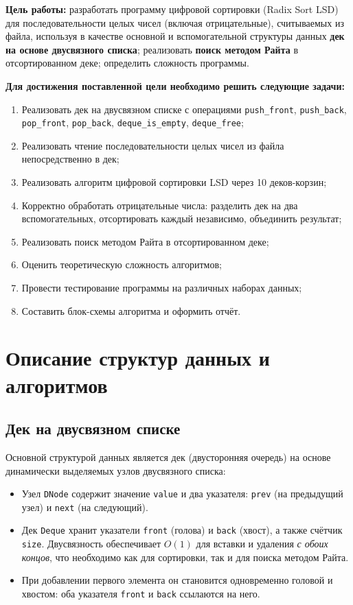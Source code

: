 \documentclass[a4paper,14pt]{extarticle}
\begin{document}
\textbf{Цель работы:} разработать программу цифровой сортировки (Radix Sort LSD) для последовательности целых чисел (включая отрицательные), считываемых из файла, используя в качестве основной и вспомогательной структуры данных \textbf{дек на основе двусвязного списка}; реализовать \textbf{поиск методом Райта} в отсортированном деке; определить сложность программы.

\vspace{0.5cm}
\textbf{Для достижения поставленной цели необходимо решить следующие задачи:}
\begin{enumerate}
  \item Реализовать дек на двусвязном списке с операциями \texttt{push\_front}, \texttt{push\_back}, \texttt{pop\_front}, \texttt{pop\_back}, \texttt{deque\_is\_empty}, \texttt{deque\_free};
  \item Реализовать чтение последовательности целых чисел из файла непосредственно в дек;
  \item Реализовать алгоритм цифровой сортировки LSD через 10 деков-корзин;
  \item Корректно обработать отрицательные числа: разделить дек на два вспомогательных, отсортировать каждый независимо, объединить результат;
  \item Реализовать поиск методом Райта в отсортированном деке;
  \item Оценить теоретическую сложность алгоритмов;
  \item Провести тестирование программы на различных наборах данных;
  \item Составить блок-схемы алгоритма и оформить отчёт.
\end{enumerate}

\newpage
\section{Описание структур данных и алгоритмов}

\subsection{Дек на двусвязном списке}

Основной структурой данных является дек (двусторонняя очередь) на основе динамически выделяемых узлов двусвязного списка:

\begin{itemize}
  \item Узел \texttt{DNode} содержит значение \texttt{value} и два указателя: \texttt{prev} (на предыдущий узел) и \texttt{next} (на следующий).
  \item Дек \texttt{Deque} хранит указатели \texttt{front} (голова) и \texttt{back} (хвост), а также счётчик \texttt{size}. Двусвязность обеспечивает $O(1)$ для вставки и удаления \textit{с обоих концов}, что необходимо как для сортировки, так и для поиска методом Райта.
  \item При добавлении первого элемента он становится одновременно головой и хвостом: оба указателя \texttt{front} и \texttt{back} ссылаются на него.
\end{itemize}
\end{document}

